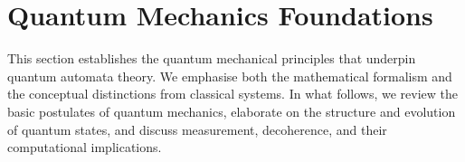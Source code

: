 \section{Quantum Mechanics Foundations}
\label{sec:quantum-foundations}

This section establishes the quantum mechanical principles that underpin quantum automata theory. We emphasise both the mathematical formalism and the conceptual distinctions from classical systems. In what follows, we review the basic postulates of quantum mechanics, elaborate on the structure and evolution of quantum states, and discuss measurement, decoherence, and their computational implications.





 
    